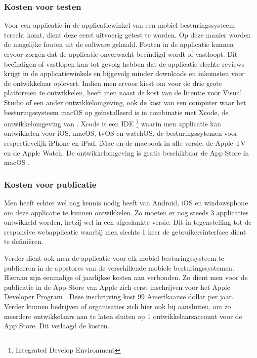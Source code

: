\subsubsection{Kosten voor testen}
Voor een applicatie in de applicatiewinkel van een mobiel besturingssysteem terecht komt, dient deze eerst uitvoerig getest te
worden. Op deze manier worden de mogelijke fouten uit de software gehaald. Fouten in de applicatie kunnen ervoor zorgen dat de applicatie
onverwacht beeïndigd wordt of vastloopt.
Dit beeïndigen of vastlopen kan tot gevolg hebben dat de applicatie slechte reviews krijgt in de applicatiewinkels en bijgevolg minder downloads en inkomsten voor de ontwikkelaar oplevert.
\newpage
Indien men ervoor kiest om voor de drie grote platformen te ontwikkelen, heeft men naast de kost van de licentie voor Visual Studio of een ander ontwikkelomgeving,
ook de kost van een computer waar het besturingssysteem macOS op geïnstalleerd is in combinatie met Xcode, de ontwikkelomgeving van \cite{xcodemacappstore2017}.
Xcode is een IDE \footnote{Integrated Develop Environment} waarin men applicatie kan ontwikkelen voor iOS, macOS, tvOS en watchOS, de besturingssytemen voor respectievelijk iPhone en iPad,
iMac en de macbook in alle versie, de Apple TV en de Apple Watch. De ontwikkelomgeving is gratis beschikbaar de App Store in macOS .

\subsubsection{Kosten voor publicatie}
Men heeft echter wel nog kennis nodig heeft van Android, iOS en windowsphone om deze applicatie te
kunnen ontwikkelen. Zo moeten er nog steeds 3 applicaties ontwikkeld worden, hetzij wel in een afgeslankte versie.
Dit in tegenstelling tot de responsive webapplicatie waarbij men slechts 1 keer de gebruikersinterface dient te definiëren.

Verder dient ook men de applicatie voor elk mobiel besturingssysteem te publiceren in de appstores van de verschillende
mobiele besturingssystemen. Hieraan zijn  eenmalige of jaarlijkse kosten aan verbonden. Zo dient men voor de publicatie in de App Store van Apple zich eerst inschrijven voor het
Apple Developer Program \citep{appledeveloperprograms2017} . Deze inschrijving kost 99 Amerikaanse dollar per jaar. Verder kunnen bedrijven of organisaties
zich hier ook bij aansluiten, om zo meerdere ontwikkelaars aan te laten sluiten op 1 ontwikkelaarsaccount voor de App Store.
Dit verlaagd de kosten.

